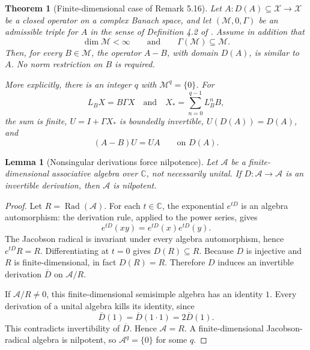 \documentclass[11pt]{article}
\newtheorem{theorem}{Theorem}
\newtheorem{lemma}{Lemma}
\newcommand{\Rad}{\operatorname{Rad}}
\begin{document}
\begin{theorem}[Finite-dimensional case of Remark 5.16]\label{thm:main}
Let \(A:D(A)\subseteq\mathcal X\to\mathcal X\) be a closed operator on a
complex Banach space, and let \((\mathcal M,0,\Gamma)\) be an admissible
triple for \(A\) in the sense of Definition 4.2 of \cite{BKU}.  Assume in
addition that
\[
  \dim\mathcal M<\infty
  \qquad\text{and}\qquad
  \Gamma(\mathcal M)\subseteq\mathcal M.
\]
Then, for every \(B\in\mathcal M\), the operator \(A-B\), with domain
\(D(A)\), is similar to \(A\).  No norm restriction on \(B\) is required.

More explicitly, there is an integer \(q\) with \(\mathcal M^q=\{0\}\).
For
\[
  L_BX=B\Gamma X
  \quad\text{and}\quad
  X_*=\sum_{n=0}^{q-1}L_B^nB,
\]
the sum is finite, \(U=I+\Gamma X_*\) is boundedly invertible,
\(U(D(A))=D(A)\), and
\[
  (A-B)U=UA\qquad\text{on }D(A).
\]
\end{theorem}

\begin{lemma}[Nonsingular derivations force nilpotence]\label{lem:nil}
Let \(\mathcal A\) be a finite-dimensional associative algebra over
\(\mathbb C\), not necessarily unital.  If \(D:\mathcal A\to\mathcal A\)
is an invertible derivation, then \(\mathcal A\) is nilpotent.
\end{lemma}

\begin{proof}
Let \(R=\Rad(\mathcal A)\).  For each \(t\in\mathbb C\), the exponential
\(e^{tD}\) is an algebra automorphism: the derivation rule, applied to the
power series, gives
\[
  e^{tD}(xy)=e^{tD}(x)e^{tD}(y).
\]
The Jacobson radical is invariant under every algebra automorphism, hence
\(e^{tD}R=R\).  Differentiating at \(t=0\) gives \(D(R)\subseteq R\).
Because \(D\) is injective and \(R\) is finite-dimensional, in fact
\(D(R)=R\).  Therefore \(D\) induces an invertible derivation
\(\overline D\) on \(\mathcal A/R\).

If \(\mathcal A/R\ne0\), this finite-dimensional semisimple algebra has an
identity \(1\).  Every derivation of a unital algebra kills its identity,
since
\[
  \overline D(1)=\overline D(1\cdot1)
    =2\overline D(1).
\]
This contradicts invertibility of \(\overline D\).  Hence
\(\mathcal A=R\).  A finite-dimensional Jacobson-radical algebra is
nilpotent, so \(\mathcal A^q=\{0\}\) for some \(q\).
\end{proof}
\end{document}
